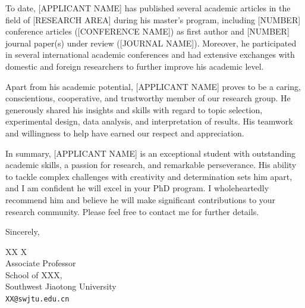 \documentclass[11pt]{article}
\begin{document}
\bigskip

To date, [APPLICANT NAME] has published several academic articles in the field of [RESEARCH AREA] during his master's program, including [NUMBER] conference articles ([CONFERENCE NAME]) as first author and [NUMBER] journal paper(s) under review ([JOURNAL NAME]). Moreover, he participated in several international academic conferences and had extensive exchanges with domestic and foreign researchers to further improve his academic level.

\bigskip

Apart from his academic potential, [APPLICANT NAME] proves to be a caring, conscientious, cooperative, and trustworthy member of our research group. He generously shared his insights and skills with regard to topic selection, experimental design, data analysis, and interpretation of results. His teamwork and willingness to help have earned our respect and appreciation.

\bigskip

In summary, [APPLICANT NAME] is an exceptional student with outstanding academic skills, a passion for research, and remarkable perseverance. His ability to tackle complex challenges with creativity and determination sets him apart, and I am confident he will excel in your PhD program. I wholeheartedly recommend him and believe he will make significant contributions to your research community. Please feel free to contact me for further details.

\bigskip

Sincerely,

\vspace{3em}

XX X \\
Associate Professor \\
School of XXX, \\
Southwest Jiaotong University \\
\texttt{XX@swjtu.edu.cn}
\end{document}
